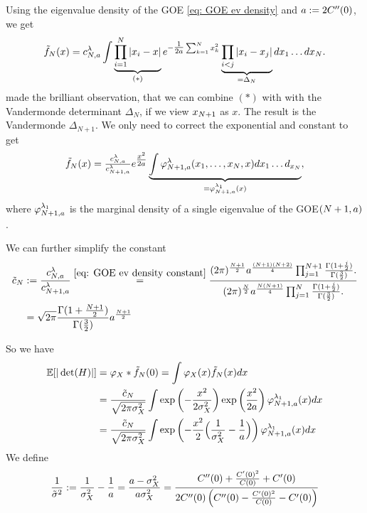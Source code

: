 Using the eigenvalue density of the GOE \eqref{eq: GOE ev density} and
\(a:=2C''(0)\), we get 
\[
	\tilde{f}_N(x)
	= c^\lambda_{N,a}\int
	\underbrace{
	\prod_{i=1}^N \left|
		x_i - x
	\right|
	}_{(*)}
	e^{-\tfrac1{2a}\sum_{k=1}^N x_k^2}
	\underbrace{\prod_{i<j}|x_i-x_j|}_{=\Delta_N} dx_1\dots dx_N.
\]
\textcite{fyodorovComplexityRandomEnergy2004} made the brilliant observation,
that we can combine \((*)\) with with the Vandermonde determinant \(\Delta_N\),
if we view \(x_{N+1}\) as \(x\). The result is the Vandermonde \(\Delta_{N+1}\).
We only need to correct the exponential and constant to get
\[
	\tilde{f}_N(x)
	= \tfrac{c^\lambda_{N, a}}{c^\lambda_{N+1,a}}
	e^{\tfrac{x^2}{2a}}
	\underbrace{\int 
	\varphi^\lambda_{N+1,a}(x_1,\dots,x_N, x)
	dx_1\dots d_{x_N}}_{=\varphi^{\lambda_1}_{N+1,a}(x)},
\]
where \(\varphi^{\lambda_1}_{N+1,a}\) is the marginal density of a single
eigenvalue of the GOE\((N+1,a)\).

We can further simplify the constant
\[\begin{aligned}
	\tilde{c}_N
	&:= \frac{c^\lambda_{N, a}}{c^\lambda_{N+1,a}}
	\overset{\eqref{eq: GOE ev density constant}}=
	\frac{
		(2\pi)^{\frac{N+1}2}a^{\frac{(N+1)(N+2)}4}
		\prod_{j=1}^{N+1} \frac{\Gamma(1+\frac{j}2)}{\Gamma(\frac32)}.
	}{
		(2\pi)^{\frac{N}2}a^{\frac{N(N+1)}4}
		\prod_{j=1}^N \frac{\Gamma(1+\frac{j}2)}{\Gamma(\frac32)}.
	}\\
	&= \sqrt{2\pi}\frac{\Gamma(1+\frac{N+1}2)}{\Gamma(\frac32)}a^{\frac{N+1}2}
\end{aligned}\]

So we have
\[\begin{aligned}
	\mathbb{E}[|\det(H)|] 
	&= \varphi_X * \tilde{f}_N(0)
	= \int \varphi_X(x)\tilde{f}_N(x)dx\\
	&= \frac{\tilde{c}_N}{\sqrt{2\pi\sigma_X^2}}
	\int \exp\left(-\frac{x^2}{2\sigma_X^2}\right)
	\exp\left( \frac{x^2}{2a} \right)\varphi^{\lambda_1}_{N+1,a}(x)dx\\
	&= \frac{\tilde{c}_N}{\sqrt{2\pi\sigma_X^2}}
	\int \exp\left(-\frac{x^2}{2}\Bigl(\frac1{\sigma_X^2}-\frac1a\Bigr)\right)
	\varphi^{\lambda_1}_{N+1,a}(x)dx
\end{aligned}\]
We define
\[
	\frac1{\tilde{\sigma}^2}
	:= \frac1{\sigma_X^2}-\frac1a
	= \frac{a - \sigma_X^2}{a\sigma_X^2}
	= \frac{C''(0)+\frac{C'(0)^2}{C(0)}+ C'(0)}{
		2C''(0)\left(C''(0) - \frac{C'(0)^2}{C(0)} - C'(0)\right)
	}
\]

